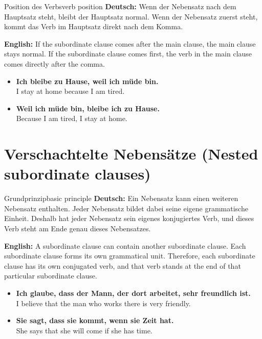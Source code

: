 \documentclass[a4paper,11pt]{article}
\newcommand{\GermanText}[1]{\textbf{Deutsch: }#1\par}
\newcommand{\EnglishText}[1]{{\small\color{SoftGray}\textbf{English: }#1\par}}
\newcommand{\ExampleItem}[2]{\item \textbf{#1}\\{\small\color{SoftGray}#2}}
\begin{document}
        \begin{grammarentry}{Position des Verbs}{verb position}
            \GermanText{Wenn der Nebensatz nach dem Hauptsatz steht, bleibt der Hauptsatz normal. Wenn der Nebensatz zuerst steht, kommt das Verb im Hauptsatz direkt nach dem Komma.}
            \EnglishText{If the subordinate clause comes after the main clause, the main clause stays normal. If the subordinate clause comes first, the verb in the main clause comes directly after the comma.}
            
            \begin{exbox}
                \begin{itemize}
                    \ExampleItem{Ich bleibe zu Hause, weil ich müde bin.}{I stay at home because I am tired.}
                    \ExampleItem{Weil ich müde bin, bleibe ich zu Hause.}{Because I am tired, I stay at home.}
                \end{itemize}
            \end{exbox}
        \end{grammarentry}


    \section{Verschachtelte Nebensätze \textnormal{(Nested subordinate clauses)}}

        \begin{grammarentry}{Grundprinzip}{basic principle}
            \GermanText{Ein Nebensatz kann einen weiteren Nebensatz enthalten. Jeder Nebensatz bildet dabei seine eigene grammatische Einheit. Deshalb hat jeder Nebensatz sein eigenes konjugiertes Verb, und dieses Verb steht am Ende genau dieses Nebensatzes.}
            \EnglishText{A subordinate clause can contain another subordinate clause. Each subordinate clause forms its own grammatical unit. Therefore, each subordinate clause has its own conjugated verb, and that verb stands at the end of that particular subordinate clause.}

            \begin{exbox}
                \begin{itemize}
                    \ExampleItem{Ich glaube, dass der Mann, der dort arbeitet, sehr freundlich ist.}{I believe that the man who works there is very friendly.}
                    \ExampleItem{Sie sagt, dass sie kommt, wenn sie Zeit hat.}{She says that she will come if she has time.}
                \end{itemize}
            \end{exbox}
        \end{grammarentry}
\end{document}
